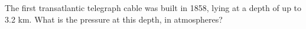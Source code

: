 The first transatlantic telegraph cable was built in 1858, lying at a
depth of up to 3.2 km.  What is the pressure at this depth, in
atmospheres?
